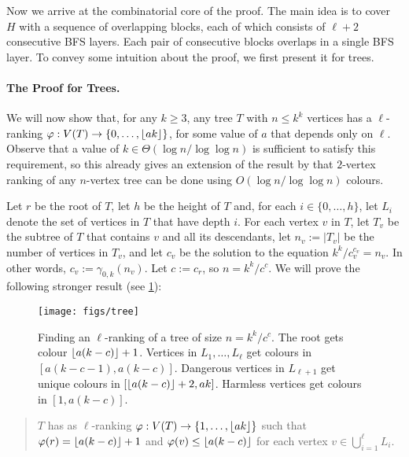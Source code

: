 \documentclass[kpfonts]{patmorin}
\theoremstyle{named}
\begin{document}
Now we arrive at the combinatorial core of the proof. The main idea is to cover $H$ with a sequence of overlapping blocks, each of which consists of $\ell+2$ consecutive BFS layers.  Each pair of consecutive blocks overlaps in a single BFS layer. To convey some intuition about the proof, we first present it for trees.

\paragraph{The Proof for Trees.}

We will now show that, for any $k\ge 3$, any tree $T$ with $n \le k^k$ vertices has a $\ell$-ranking $\varphi:V(T)\to\{0,\ldots,{\lfloor ak \rfloor}\}$, for some value of $a$ that depends only on $\ell$.  Observe that a value of $k\in\Theta(\log n/\log\log n)$ is sufficient to satisfy this requirement, so this already gives an extension of the result by \citet{karpas.neiman.ea:on} that $2$-vertex ranking of any $n$-vertex tree can be done using $O(\log n/\log\log n)$ colours.

Let $r$ be the root of $T$, let $h$ be the height of $T$ and, for each $i\in\{0,\ldots,h\}$, let $L_i$ denote the set of vertices in $T$ that have depth $i$.  For each vertex $v$ in $T$, let $T_v$ be the subtree of $T$ that contains $v$ and all its descendants, let $n_v:=|T_v|$ be the number of vertices in $T_v$, and let $c_v$ be the solution to the equation $k^k/c_v^{c_v} = n_v$.  In other words, $c_v:=\gamma_{0,k}(n_v)$.  Let $c:=c_r$, so $n=k^k/c^c$.  We will prove the following stronger result (see \cref{tree_fig}):

\begin{figure}
  \begin{center}
    \texttt{[image: figs/tree]}
  \end{center}
  \caption{Finding an $\ell$-ranking of a tree of size $n=k^k/c^c$.  The root gets colour ${\lfloor a(k-c) \rfloor}+1$. Vertices in $L_1,\ldots,L_{\ell}$ get colours in $[a(k-c-1),a(k-c)]$.  Dangerous vertices in $L_{\ell+1}$ get unique colours in $[{\lfloor a(k-c) \rfloor}+2,ak]$.  Harmless vertices get colours in $[1,a(k-c)]$.}
  \label{tree_fig}
\end{figure}

\begin{quote}
    $T$ has as $\ell$-ranking $\varphi:V(T)\to\{1,\ldots,{\lfloor ak \rfloor}\}$ such that $\varphi(r)={\lfloor a(k-c) \rfloor}+1$ and $\varphi(v)\le {\lfloor a(k-c) \rfloor}$ for each vertex $v\in\bigcup_{i=1}^\ell L_i$.
\end{quote}
\end{document}
